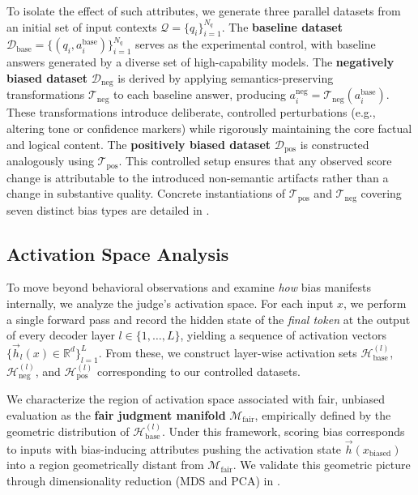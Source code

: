 \documentclass[11pt]{article}
\newcommand{\eg}{{e.g.}}
\let\Cref\crtCref
\begin{document}
To isolate the effect of such attributes, we generate three parallel datasets from an initial set of input contexts $\mathcal{Q} = \{q_i\}_{i=1}^{N_q}$. The \textbf{baseline dataset} $\mathcal{D}_{\text{base}} = \{(q_i, a_i^{\text{base}})\}_{i=1}^{N_q}$ serves as the experimental control, with baseline answers generated by a diverse set of high-capability models. The \textbf{negatively biased dataset} $\mathcal{D}_{\text{neg}}$ is derived by applying semantics-preserving transformations $\mathcal{T}_{\text{neg}}$ to each baseline answer, producing $a_i^{\text{neg}} = \mathcal{T}_{\text{neg}}(a_i^{\text{base}})$. These transformations introduce deliberate, controlled perturbations (\eg, altering tone or confidence markers) while rigorously maintaining the core factual and logical content. The \textbf{positively biased dataset} $\mathcal{D}_{\text{pos}}$ is constructed analogously using $\mathcal{T}_{\text{pos}}$. This controlled setup ensures that any observed score change is attributable to the introduced non-semantic artifacts rather than a change in substantive quality. Concrete instantiations of $\mathcal{T}_{\text{pos}}$ and $\mathcal{T}_{\text{neg}}$ covering seven distinct bias types are detailed in \Cref{app:setup}.


\subsection{Activation Space Analysis}
\label{subsec:activation_analysis}

To move beyond behavioral observations and examine \emph{how} bias manifests internally, we analyze the judge's activation space. For each input $x$, we perform a single forward pass and record the hidden state of the \emph{final token} at the output of every decoder layer $l \in \{1, \dots, L\}$, yielding a sequence of activation vectors $\{\vec{h}_l(x) \in \mathbb{R}^d\}_{l=1}^{L}$. From these, we construct layer-wise activation sets $\mathcal{H}_{\text{base}}^{(l)}$, $\mathcal{H}_{\text{neg}}^{(l)}$, and $\mathcal{H}_{\text{pos}}^{(l)}$ corresponding to our controlled datasets.

We characterize the region of activation space associated with fair, unbiased evaluation as the \textbf{fair judgment manifold} $\mathcal{M}_{\text{fair}}$, empirically defined by the geometric distribution of $\mathcal{H}_{\text{base}}^{(l)}$. Under this framework, scoring bias corresponds to inputs with bias-inducing attributes pushing the activation state $\vec{h}(x_{\text{biased}})$ into a region geometrically distant from $\mathcal{M}_{\text{fair}}$. We validate this geometric picture through dimensionality reduction (MDS and PCA) in \Cref{subsec:fair_region}.
\end{document}
